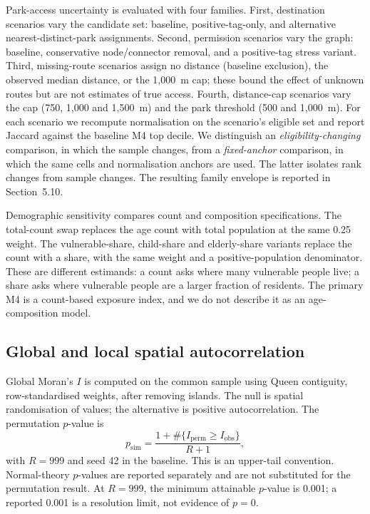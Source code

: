 \documentclass[times,twoside]{_Templates/MultiTargetManuscript}
\begin{document}
Park-access uncertainty is evaluated with four families. First, destination
scenarios vary the candidate set: baseline, positive-tag-only, and alternative
nearest-distinct-park assignments. Second, permission scenarios vary the graph:
baseline, conservative node/connector removal, and a positive-tag stress
variant. Third, missing-route scenarios assign no distance (baseline exclusion),
the observed median distance, or the 1,000~m cap; these bound the effect of
unknown routes but are not estimates of true access. Fourth, distance-cap
scenarios vary the cap (750, 1,000 and 1,500~m) and the park threshold (500 and
1,000~m). For each scenario we recompute normalisation on the scenario's
eligible set and report Jaccard against the baseline M4 top decile. We
distinguish an \emph{eligibility-changing} comparison, in which the sample
changes, from a \emph{fixed-anchor} comparison, in which the same cells and
normalisation anchors are used. The latter isolates rank changes from sample
changes. The resulting family envelope is reported in Section~5.10.

Demographic sensitivity compares count and composition specifications. The
total-count swap replaces the age count with total population at the same 0.25
weight. The vulnerable-share, child-share and elderly-share variants replace the
count with a share, with the same weight and a positive-population denominator.
These are different estimands: a count asks where many vulnerable people live; a
share asks where vulnerable people are a larger fraction of residents. The
primary M4 is a count-based exposure index, and we do not describe it as an
age-composition model.

\subsection{Global and local spatial autocorrelation}

Global Moran's $I$ is computed on the common sample using Queen contiguity,
row-standardised weights, after removing islands. The null is spatial
randomisation of values; the alternative is positive autocorrelation. The
permutation $p$-value is
\begin{equation}
p_{\mathrm{sim}} = \frac{1 + \#\{I_{\mathrm{perm}} \ge I_{\mathrm{obs}}\}}{R+1},
\label{eq:moranp}
\end{equation}
with $R=999$ and seed 42 in the baseline. This is an upper-tail convention.
Normal-theory $p$-values are reported separately and are not substituted for the
permutation result. At $R=999$, the minimum attainable $p$-value is 0.001; a
reported 0.001 is a resolution limit, not evidence of $p=0$.
\end{document}
